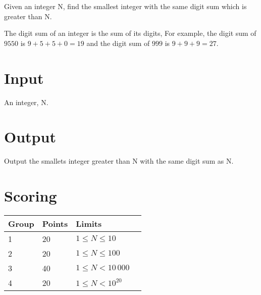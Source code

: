 
Given an integer N, find the smallest integer with the same digit sum which is greater than N.

The digit sum of an integer is the sum of its digits, For example, the digit sum of $9550$ is $9 + 5 + 5 + 0 = 19$ and the digit sum of $999$ is $9 + 9 + 9 = 27$.

\section*{Input}
An integer, N.

\section*{Output}
Output the smallets integer greater than N with the same digit sum as N.

\section*{Scoring}

\begin{tabular}{| l | l | l | l |}
\hline
Group & Points     & Limits \\ \hline
1     & 20         & $1 \le N \le 10$ \\ \hline	
2     & 20         & $1 \le N \le 100$ \\ \hline	
3     & 40         & $1 \le N < 10\,000$ \\ \hline	
4     & 20         & $1 \le N < 10^{20}$ \\ \hline	
\end{tabular}
